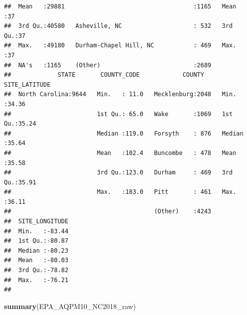 \documentclass[12pt,]{article}
\newenvironment{Shaded}{\begin{snugshade}}{\end{snugshade}}
\newcommand{\KeywordTok}[1]{\textcolor[rgb]{0.13,0.29,0.53}{\textbf{#1}}}
\newcommand{\NormalTok}[1]{#1}
\begin{document}
\begin{verbatim}
##  Mean   :29881                                    :1165   Mean   :37  
##  3rd Qu.:40580   Asheville, NC                    : 532   3rd Qu.:37  
##  Max.   :49180   Durham-Chapel Hill, NC           : 469   Max.   :37  
##  NA's   :1165    (Other)                          :2689               
##             STATE       COUNTY_CODE            COUNTY     SITE_LATITUDE  
##  North Carolina:9644   Min.   : 11.0   Mecklenburg:2048   Min.   :34.36  
##                        1st Qu.: 65.0   Wake       :1069   1st Qu.:35.24  
##                        Median :119.0   Forsyth    : 876   Median :35.64  
##                        Mean   :102.4   Buncombe   : 478   Mean   :35.58  
##                        3rd Qu.:123.0   Durham     : 469   3rd Qu.:35.91  
##                        Max.   :183.0   Pitt       : 461   Max.   :36.11  
##                                        (Other)    :4243                  
##  SITE_LONGITUDE  
##  Min.   :-83.44  
##  1st Qu.:-80.87  
##  Median :-80.23  
##  Mean   :-80.03  
##  3rd Qu.:-78.82  
##  Max.   :-76.21  
## 
\end{verbatim}

\begin{Shaded}
\begin{Highlighting}[]
\KeywordTok{summary}\NormalTok{(EPA_AQPM10_NC2018_raw)}
\end{Highlighting}
\end{Shaded}
\end{document}
